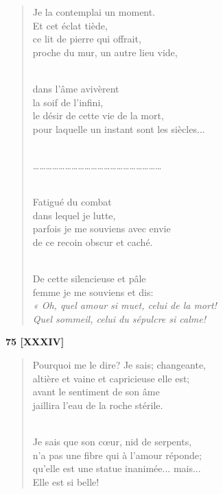 \documentclass[a4paper,11pt]{book}
\begin{document}
\begin{verse}
Je la contemplai un moment. \\
Et cet éclat tiède, \\
ce lit de pierre qui offrait, \\
proche du mur, un autre lieu vide, \\ \

dans l'âme avivèrent \\
la soif de l'infini, \\
le désir de cette vie de la mort, \\
pour laquelle un instant sont les siècles... \\ \

\ldots\ldots\ldots\ldots\ldots\ldots\ldots\ldots\ldots\ldots\ldots\ldots\ldots\ldots\ldots\ldots\ldots\ldots\ldots\ldots \\ \

Fatigué du combat \\
dans lequel je lutte, \\
parfois je me souviens avec envie \\
de ce recoin obscur et caché. \\ \

De cette silencieuse et pâle \\
femme je me souviens et dis: \\
{\em « Oh, quel amour si muet, celui de la mort! \\
Quel sommeil, celui du sépulcre si calme!} \\
\end{verse}

\bigskip

\begin{center} {\bf 75 [XXXIV]} \end{center}

\begin{verse}
Pourquoi me le dire? Je sais; changeante, \\
altière et vaine et capricieuse elle est; \\
avant le sentiment de son âme \\
jaillira l'eau de la roche stérile. \\ \

Je sais que son c{\oe}ur, nid de serpents, \\
n'a pas une fibre qui à l'amour réponde; \\
qu'elle est une statue inanimée... mais... \\
Elle est si belle! \\
\end{verse}
\end{document}
